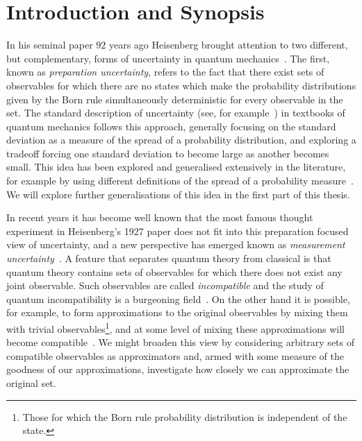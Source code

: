 

\let\textcircled=\pgftextcircled
\chapter{Introduction and Synopsis}
\label{chap:intro}

In his seminal paper $92$ years ago Heisenberg brought attention to two different, but complementary, forms of uncertainty in quantum mechanics~\cite{Heisenberg1927-Wheeler+Zurek}. The first, known as \emph{preparation uncertainty}, refers to the fact that there exist sets of observables for which there are no states which make the probability distributions given by the Born rule simultaneously deterministic for every observable in the set. The standard description of uncertainty (see, for example~\cite{griffiths2005introduction}) in textbooks of quantum mechanics follows this approach, generally focusing on the standard deviation as a measure of the spread of a probability distribution, and exploring a tradeoff forcing one standard deviation to become large as another becomes small. This idea has been explored and generalised extensively in the literature, for example by using different definitions of the spread of a probability measure~\cites{MaassenUffink1988}{doi:10.1063/1.3614503}{doi:10.1063/1.2759831}. We will explore further generalisations of this idea in the first part of this thesis.

In recent years it has become well known that the most famous thought experiment in Heisenberg's 1927 paper does not fit into this preparation focused view of uncertainty, and a new perspective has emerged known as \emph{measurement uncertainty}~\cites{PhysRevLett.111.160405}{blw-meas-uncertainty}{6773660Werner:2004:URJ:2011593.2011606}. A feature that separates quantum theory from classical is that quantum theory contains sets of observables for which there does not exist any joint observable. Such observables are called \emph{incompatible} and the study of quantum incompatibility is a burgeoning field~\cites{Heinosaari_2016}{PhysRevLett.122.130402}{Heinosaari_2017}{PhysRevA.96.052127}. On the other hand it is possible, for example, to form approximations to the original observables by mixing them with trivial observables\footnote{Those for which the Born rule probability distribution is independent of the state.}, and at some level of mixing these approximations will become compatible~\cite{PhysRevA.87.052125}. We might broaden this view by considering arbitrary sets of compatible observables as approximators and, armed with some measure of the goodness of our approximations, investigate how closely we can approximate the original set.


